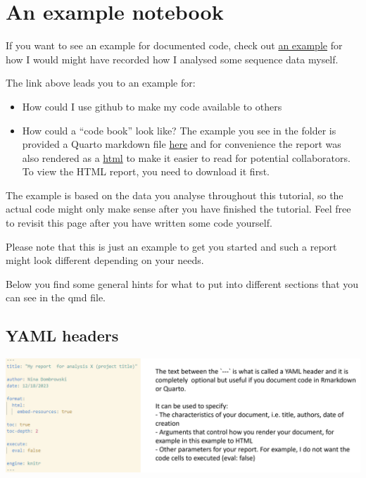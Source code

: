 \documentclass[
  letterpaper,
  DIV=11,
  numbers=noendperiod]{scrreprt}
\author{}
\date{}
\providecommand{\tightlist}{%
  \setlength{\itemsep}{0pt}\setlength{\parskip}{0pt}}\usepackage{longtable,booktabs,array}
\renewcommand*\contentsname{Table of contents}
\newcommand\contentsname{Table of contents}
\begin{document}

\renewcommand*\contentsname{Table of contents}
{
\hypersetup{linkcolor=}
\setcounter{tocdepth}{1}
\tableofcontents
}
\section{An example notebook}\label{an-example-notebook}

If you want to see an example for documented code, check out
\href{https://github.com/ndombrowski/cli_workshop/tree/main/example_doc}{an
example} for how I would might have recorded how I analysed some
sequence data myself.

The link above leads you to an example for:

\begin{itemize}
\tightlist
\item
  How could I use github to make my code available to others
\item
  How could a ``code book'' look like? The example you see in the folder
  is provided a Quarto markdown file
  \href{https://github.com/ndombrowski/cli_workshop/blob/main/example_doc/example_notebook.qmd}{here}
  and for convenience the report was also rendered as a
  \href{https://github.com/ndombrowski/cli_workshop/blob/main/docs/example_doc/example_notebook.html}{html}
  to make it easier to read for potential collaborators. To view the
  HTML report, you need to download it first.
\end{itemize}

The example is based on the data you analyse throughout this tutorial,
so the actual code might only make sense after you have finished the
tutorial. Feel free to revisit this page after you have written some
code yourself.

Please note that this is just an example to get you started and such a
report might look different depending on your needs.

Below you find some general hints for what to put into different
sections that you can see in the qmd file.

\subsection{YAML headers}\label{yaml-headers}

\includegraphics[width=7.84375in,height=\textheight]{../img/yaml_header.png}
\end{document}
